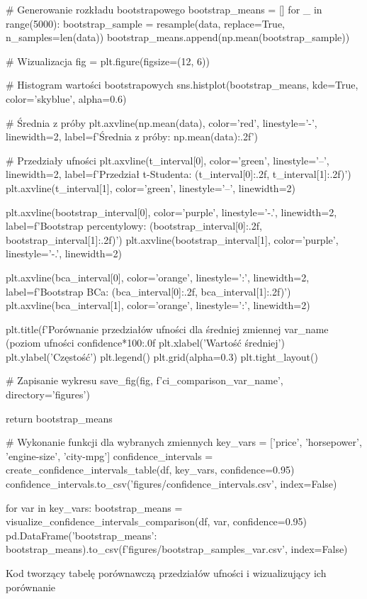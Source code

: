 \documentclass[12pt,a4paper]{article}
\begin{document}
{    # Generowanie rozkładu bootstrapowego
    bootstrap_means = []
    for _ in range(5000):
        bootstrap_sample = resample(data, replace=True, n_samples=len(data))
        bootstrap_means.append(np.mean(bootstrap_sample))
    
    # Wizualizacja
    fig = plt.figure(figsize=(12, 6))
    
    # Histogram wartości bootstrapowych
    sns.histplot(bootstrap_means, kde=True, color='skyblue', alpha=0.6)
    
    # Średnia z próby
    plt.axvline(np.mean(data), color='red', linestyle='-', linewidth=2, 
                label=f'Średnia z próby: {np.mean(data):.2f}')
    
    # Przedziały ufności
    plt.axvline(t_interval[0], color='green', linestyle='--', linewidth=2, 
                label=f'Przedział t-Studenta: ({t_interval[0]:.2f}, {t_interval[1]:.2f})')
    plt.axvline(t_interval[1], color='green', linestyle='--', linewidth=2)
    
    plt.axvline(bootstrap_interval[0], color='purple', linestyle='-.', linewidth=2, 
                label=f'Bootstrap percentylowy: ({bootstrap_interval[0]:.2f}, {bootstrap_interval[1]:.2f})')
    plt.axvline(bootstrap_interval[1], color='purple', linestyle='-.', linewidth=2)
    
    plt.axvline(bca_interval[0], color='orange', linestyle=':', linewidth=2, 
                label=f'Bootstrap BCa: ({bca_interval[0]:.2f}, {bca_interval[1]:.2f})')
    plt.axvline(bca_interval[1], color='orange', linestyle=':', linewidth=2)
    
    plt.title(f'Porównanie przedziałów ufności dla średniej zmiennej {var_name} (poziom ufności {confidence*100:.0f}%
    plt.xlabel('Wartość średniej')
    plt.ylabel('Częstość')
    plt.legend()
    plt.grid(alpha=0.3)
    plt.tight_layout()
    
    # Zapisanie wykresu
    save_fig(fig, f'ci_comparison_{var_name}', directory='figures')
    
    return bootstrap_means

# Wykonanie funkcji dla wybranych zmiennych
key_vars = ['price', 'horsepower', 'engine-size', 'city-mpg']
confidence_intervals = create_confidence_intervals_table(df, key_vars, confidence=0.95)
confidence_intervals.to_csv('figures/confidence_intervals.csv', index=False)

for var in key_vars:
    bootstrap_means = visualize_confidence_intervals_comparison(df, var, confidence=0.95)
    pd.DataFrame({'bootstrap_means': bootstrap_means}).to_csv(f'figures/bootstrap_samples_{var}.csv', index=False)
}{Kod tworzący tabelę porównawczą przedziałów ufności i wizualizujący ich porównanie}
\end{document}
